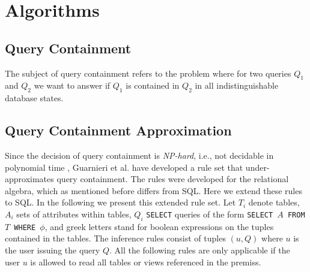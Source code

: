\section{Algorithms}

\subsection{Query Containment}

The subject of query containment refers to the problem where for two queries $Q_1$ and $Q_2$ we want to answer if $Q_1$ is contained in $Q_2$ in all indistinguishable database states.
%
%



\subsection{Query Containment Approximation}


Since the decision of query containment is \emph{NP-hard}, i.e., not decidable in polynomial time ,   Guarnieri et al. have developed a rule set that under-approximates query containment.
%
The rules were developed for the relational algebra, which as mentioned before differs from SQL. 
%
Here we extend these rules to SQL.
%
In the following we present this extended rule set. 
%
Let $T_i$ denote tables, $A_i$ sets of attributes within tables, $Q_i$ \texttt{SELECT} queries of the form \texttt{SELECT $A$ FROM $T$ WHERE $\phi$}, and greek letters stand for boolean expressions on the tuples contained in the tables.
%
The inference rules consist of tuples $(u,Q)$ where $u$ is the user issuing the query $Q$.
%
All the following rules are only applicable if the user $u$ is allowed to read all tables or views referenced in the premiss.

